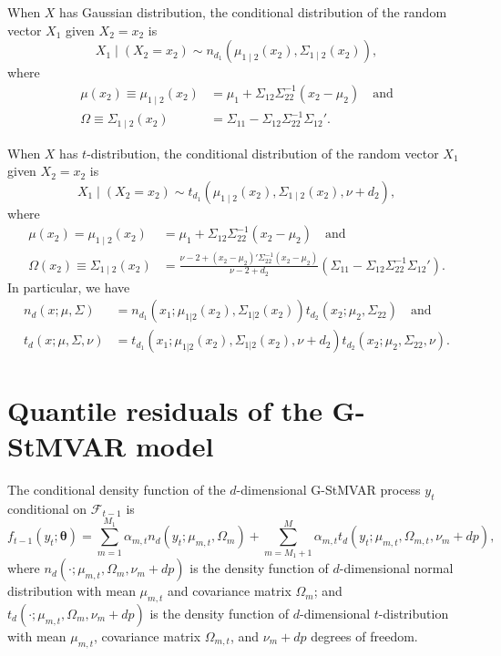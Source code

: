 \documentclass[nojss]{jss}
\begin{document}
\begin{appendix}
When $X$ has Gaussian distribution,  the conditional distribution of the random vector $X_1$ given $X_2=x_2$ is
\begin{equation}
X_1\mid(X_2=x_2)\sim n_{d_1}(\mu_{1\mid2}(x_2),\Sigma_{1\mid2}(x_2)),
\end{equation}
where
\begin{align}
\mu (x_2)\equiv \mu_{1\mid2}(x_2) &= \mu_1+\Sigma_{12}\Sigma_{22}^{-1}(x_2-\mu_2) \quad \text{and}\label{eq:mux_gaus} \\
\Omega \equiv \Sigma_{1\mid2}(x_2) &= \Sigma_{11}-\Sigma_{12}\Sigma_{22}^{-1}\Sigma_{12}'. \label{eq:omegax_gaus}
\end{align}

When $X$ has $t$-distribution, the conditional distribution of the random vector $X_1$ given $X_2=x_2$ is
\begin{equation}
X_1\mid(X_2=x_2)\sim t_{d_1}(\mu_{1\mid2}(x_2),\Sigma_{1\mid2}(x_2),\nu+d_2),
\end{equation}
where
\begin{align}
\mu (x_2) = \mu_{1\mid2}(x_2) &= \mu_1+\Sigma_{12}\Sigma_{22}^{-1}(x_2-\mu_2) \quad \text{and}\label{eq:mux} \\
\Omega (x_2) \equiv \Sigma_{1\mid2}(x_2) &= \frac{\nu-2+(x_2-\mu_2)'\Sigma_{22}^{-1}(x_2-\mu_2)}{\nu-2+d_2}(\Sigma_{11}-\Sigma_{12}\Sigma_{22}^{-1}\Sigma_{12}'). \label{eq:omegax}
\end{align}
In particular, we have
\begin{align}\label{eq:td_decomp}
n_d(x;\mu,\Sigma) &= n_{d_1}(x_1;\mu_{1|2}(x_2),\Sigma_{1|2}(x_2))t_{d_2}(x_2;\mu_2,\Sigma_{22}) \quad \text{and}\\
t_d(x;\mu,\Sigma,\nu) &= t_{d_1}(x_1;\mu_{1|2}(x_2),\Sigma_{1|2}(x_2),\nu+d_2)t_{d_2}(x_2;\mu_2,\Sigma_{22},\nu).
\end{align}


\section{Quantile residuals of the G-StMVAR model}\label{ap:qresexpr}

The conditional density function of the $d$-dimensional G-StMVAR process $y_t$ conditional on  $\mathcal{F}_{t-1}$ is
\begin{equation}\label{eq:gstmvarconddens}
f_{t-1}(y_t;\boldsymbol{\theta})=\sum_{m=1}^{M_1}\alpha_{m,t}n_d(y_t;\mu_{m,t},\Omega_{m}) + \sum_{m=M_1+1}^{M}\alpha_{m,t}t_d(y_t;\mu_{m,t},\Omega_{m,t},\nu_m + dp),
\end{equation}
where $n_d(\cdot;\mu_{m,t},\Omega_m,\nu_m + dp)$ is the density function of $d$-dimensional normal distribution with mean $\mu_{m,t}$ and covariance matrix $\Omega_{m}$; and  $t_d(\cdot;\mu_{m,t},\Omega_m,\nu_m + dp)$ is the density function of $d$-dimensional $t$-distribution with mean $\mu_{m,t}$, covariance matrix $\Omega_{m,t}$,  and $\nu_m + dp$ degrees of freedom.


\end{appendix}
\end{document}
